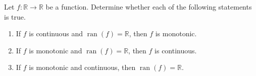 \begin{problem}
    Let \( f \colon \mathbb{R} \to \mathbb{R} \) be a function. Determine whether each of the following statements is true.
    \begin{enumerate}
        \item[(a)] If \( f \) is continuous and \( \operatorname{ran}\left(f\right) = \mathbb{R} \), then \( f \) is monotonic.
        \item[(b)] If \( f \) is monotonic and \( \operatorname{ran}\left(f\right) = \mathbb{R} \), then \( f \) is continuous.
        \item[(c)] If \( f \) is monotonic and continuous, then \( \operatorname{ran}\left(f\right) = \mathbb{R} \).
    \end{enumerate}
\end{problem}

